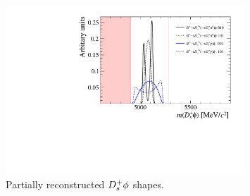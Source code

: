 \begin{figure}[!h]
    \centering
    \includegraphics[width=0.80\textwidth]{figs/B2DsPhi/DsPhi_part_reco_Shapes.pdf}
    \caption{Partially reconstructed ${{D}^+_{s}}\phi$ shapes.}
    \label{fig:B2DsPhi_DsPhi_partreco}   
\end{figure}


